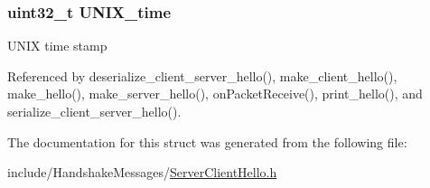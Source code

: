 \subsubsection[{\texorpdfstring{U\+N\+I\+X\+\_\+time}{UNIX_time}}]{\setlength{\rightskip}{0pt plus 5cm}uint32\+\_\+t U\+N\+I\+X\+\_\+time}\hypertarget{structrandom__data__t_a905c3cf8e7be80f2a3255f99c3ee2fb4}{}\label{structrandom__data__t_a905c3cf8e7be80f2a3255f99c3ee2fb4}
U\+N\+IX time stamp 

Referenced by deserialize\+\_\+client\+\_\+server\+\_\+hello(), make\+\_\+client\+\_\+hello(), make\+\_\+hello(), make\+\_\+server\+\_\+hello(), on\+Packet\+Receive(), print\+\_\+hello(), and serialize\+\_\+client\+\_\+server\+\_\+hello().



The documentation for this struct was generated from the following file\+:\begin{DoxyCompactItemize}
\item 
include/\+Handshake\+Messages/\hyperlink{_server_client_hello_8h}{Server\+Client\+Hello.\+h}\end{DoxyCompactItemize}
